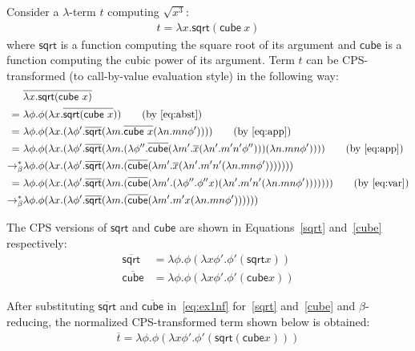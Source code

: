 \begin{example} \label{ex:CPS1} Consider a $\lambda$-term $t$ computing  $\sqrt{x^3}$:
% 
\begin{align*}
t = \lambda x. \mathsf{sqrt} (\mathsf{cube} \ x)
\end{align*}
%
where $\mathsf{sqrt}$ is a function computing the square root of its argument and $\mathsf{cube}$ is a function computing the cubic power of its argument. Term $t$ can be CPS-transformed (to call-by-value evaluation style) in the following way:
%
 { \small
 \begin{align}
&\overline{\lambda x. \mathsf{sqrt} (\mathsf{cube} \ x )} \notag \\
 = \ &\lambda \phi. \phi (\lambda x. \overline{\mathsf{sqrt} (\mathsf{cube} \ x})) \tag{by~\eqref{eq:abst}} \\
  = \  & \lambda \phi. \phi (\lambda x. (\lambda \phi'. \overline{\mathsf{sqrt}} (\lambda m.\overline{\mathsf{cube} \ x} (\lambda n. m n \phi') ) ) )\tag{by~\eqref{eq:app}} \\
  = \ & \lambda \phi. \phi (\lambda x. (\lambda \phi'. \overline{\mathsf{sqrt}} (\lambda m. ( \lambda \phi''. \overline{\mathsf{cube}} (\lambda m'. \overline{x} (\lambda n'. m'n' \phi'') ) )   (\lambda n. m n \phi') ) ) )\tag{by~\eqref{eq:app}} \\
  \bred & \lambda \phi. \phi (\lambda x. (\lambda \phi'. \overline{\mathsf{sqrt}} (\lambda m. ( \overline{\mathsf{cube}} (\lambda m'. \overline{x} (\lambda n'. m'n'  (\lambda n. m n \phi') ) ) )   ) ) )\notag \\
  = \ & \lambda \phi. \phi (\lambda x. (\lambda \phi'. \overline{\mathsf{sqrt}} (\lambda m. ( \overline{\mathsf{cube}} (\lambda m'. (\lambda \phi''.\phi'' x) (\lambda n'. m'n'  (\lambda n. m n \phi') ) ) )   ) ) )\tag{by~\eqref{eq:var}} \\
  \bred  &\lambda \phi. \phi (\lambda x. (\lambda \phi'. \overline{\mathsf{sqrt}} (\lambda m. ( \overline{\mathsf{cube}} (\lambda m'. m' x  (\lambda n. m n \phi') ) )  ) ) ) \label{eq:ex1nf}
 \end{align} }
 
The CPS versions of $\mathsf{sqrt}$ and $\mathsf{cube}$ are shown in Equations~\eqref{sqrt} and~\eqref{cube} respectively:
%
\begin{subequations}
\begin{align}
\overline{\mathsf{sqrt}} & = \lambda \phi. \phi ( \lambda x \phi'. \phi ' (\mathsf{sqrt}  x))  \label{sqrt} \\
\overline{\mathsf{cube}} & = \lambda \phi. \phi  (  \lambda x \phi'. \phi ' (\mathsf{cube}  x)) \label{cube}
\end{align} 
\end{subequations}

After substituting $\overline{\mathsf{sqrt}}$ and $\overline{\mathsf{cube}}$ in~\eqref{eq:ex1nf} for~\eqref{sqrt} and~\eqref{cube} and $\beta$-reducing,  the normalized CPS-transformed term shown below is obtained:
%
\begin{align*}  
\overline{t} =\lambda \phi. \phi ( \lambda x \phi'. \phi' (\mathsf{sqrt} (\mathsf{cube} x) ) )
\end{align*} 
\end{example} 

